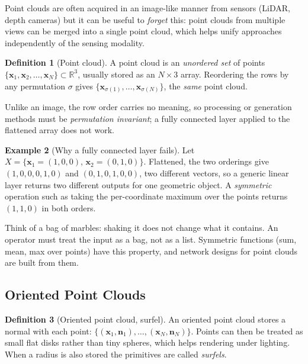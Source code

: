 \documentclass[11pt,a4paper]{article}
\newcommand{\R}{\mathbb{R}}
\newcommand{\vx}{\bm{x}}
\newcommand{\vn}{\bm{n}}
\theoremstyle{definition}
\newtheorem{definition}{Definition}[section]
\newtheorem{example}[definition]{Example}
\theoremstyle{plain}
\theoremstyle{remark}
\begin{document}
Point clouds are often acquired in an image-like manner from sensors (LiDAR, depth cameras) but it can be useful to \emph{forget} this: point clouds from multiple views can be merged into a single point cloud, which helps unify approaches independently of the sensing modality.

\begin{definition}[Point cloud]
A point cloud is an \emph{unordered set} of points $\{\vx_1,\vx_2,\dots,\vx_N\}\subset\R^3$, usually stored as an $N\times 3$ array. Reordering the rows by any permutation $\sigma$ gives $\{\vx_{\sigma(1)},\dots,\vx_{\sigma(N)}\}$, the \emph{same} point cloud.
\end{definition}

Unlike an image, the row order carries no meaning, so processing or generation methods must be \emph{permutation invariant}; a fully connected layer applied to the flattened array does not work.

\begin{example}[Why a fully connected layer fails]
Let $X=\{\vx_1=(1,0,0),\,\vx_2=(0,1,0)\}$. Flattened, the two orderings give $(1,0,0,0,1,0)$ and $(0,1,0,1,0,0)$, two different vectors, so a generic linear layer returns two different outputs for one geometric object. A \emph{symmetric} operation such as taking the per-coordinate maximum over the points returns $(1,1,0)$ in both orders.
\end{example}

\begin{intuition}
Think of a bag of marbles: shaking it does not change what it contains. An operator must treat the input as a bag, not as a list. Symmetric functions (sum, mean, max over points) have this property, and network designs for point clouds are built from them.
\end{intuition}

\subsection{Oriented Point Clouds }
\begin{definition}[Oriented point cloud, surfel]
An oriented point cloud stores a normal with each point: $\{(\vx_1,\vn_1),\dots,(\vx_N,\vn_N)\}$. Points can then be treated as small flat disks rather than tiny spheres, which helps rendering under lighting. When a radius is also stored the primitives are called \emph{surfels}.
\end{definition}
\end{document}
